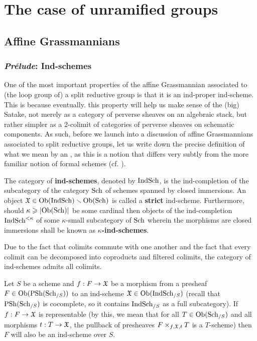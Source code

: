 \section{The case of unramified groups}
    \subsection{Affine Grassmannians}
        \subsubsection{\textit{Pr\'elude}: Ind-schemes}
            One of the most important properties of the affine Grassmannian associated to (the loop group of) a split reductive group is that it is an ind-proper ind-scheme. This is because eventually. this property will help us make sense of the (big) Satake, not merely as a category of perverse sheaves on an algebraic stack, but rather simpler as a $2$-colimit of categories of perverse sheaves on schematic components. As such, before we launch into a discussion of affine Grassmannians associated to split reductive groups, let us write down the precise definition of what we mean by an , as this is a notion that differs very subtly from the more familiar notion of formal schemes (cf. \cite[Section II.9]{hartshorne}).
            \begin{definition} \label{def: ind_schemes}
                The category of \textbf{ind-schemes}, denoted by $\mathrm{Ind}\mathrm{Sch}$, is the ind-completion of the subcategory of the category $\mathrm{Sch}$ of schemes spanned by closed immersions. An object $\mathfrak{X} \in \mathrm{Ob}(\mathrm{Ind}\mathrm{Sch}) \smallsetminus \mathrm{Ob}(\mathrm{Sch})$ is called a \textbf{strict} ind-scheme. Furthermore, should $\kappa \geqslant |\mathrm{Ob}(\mathrm{Sch})|$ be some cardinal then objects of the ind-completion $\mathrm{Ind}\mathrm{Sch}^{< \kappa}$ of some $\kappa$-small subcategory of $\mathrm{Sch}$ wherein the morphisms are closed immersions shall be known as \textbf{$\kappa$-ind-schemes}.
            \end{definition}
            \begin{remark} \label{remark: colimits_of_ind_schemes}
                Due to the fact that colimits commute with one another and the fact that every colimit can be decomposed into coproducts and filtered colimits, the category of ind-schemes admits all colimits. 
            \end{remark}
            \begin{proposition} \label{prop: representable_morphisms_of_ind_schemes}
                Let $S$ be a scheme and $f: F \to \mathfrak{X}$ be a morphism from a presheaf $F \in \mathrm{Ob}(\mathrm{PSh}(\mathrm{Sch}_{/S}))$ to an ind-scheme $\mathfrak{X} \in \mathrm{Ob}(\mathrm{Ind}\mathrm{Sch}_{/S})$ (recall that $\mathrm{PSh}(\mathrm{Sch}_{/S})$ is cocomplete, so it contains $\mathrm{Ind}\mathrm{Sch}_{/S}$ as a full subcategory). If $f: F \to \mathfrak{X}$ is representable (by this, we mean that for all $T \in \mathrm{Ob}(\mathrm{Sch}_{/S})$ and all morphisms $t: T \to \mathfrak{X}$, the pullback of presheaves $F \x_{f, \frakX, t} T$ is a $T$-scheme) then $F$ will also be an ind-scheme over $S$. 
            \end{proposition}
